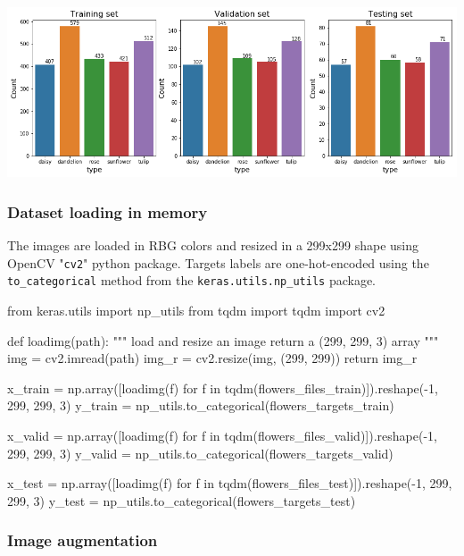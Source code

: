 \begin{flushleft}
	\includegraphics[scale=.5]{./sections/03_methodology/output_18_0.png}
\end{flushleft}

\newpage
\subsubsection{Dataset loading in memory}

The images are loaded in RBG colors and resized in a 299x299 shape using OpenCV "\texttt{cv2}" python package. 
Targets labels are one-hot-encoded using the \texttt{to\_categorical} method from the \texttt{keras.utils.np\_utils} package.

\begin{python}
from keras.utils import np_utils
from tqdm import tqdm
import cv2

def loadimg(path):
	"""
	load and resize an image
	return a (299, 299, 3) array
	"""
	img = cv2.imread(path)
	img_r = cv2.resize(img, (299, 299))
	return img_r

x_train = np.array([loadimg(f) for f in tqdm(flowers_files_train)]).reshape(-1, 299, 299, 3)
y_train =  np_utils.to_categorical(flowers_targets_train)

x_valid = np.array([loadimg(f) for f in tqdm(flowers_files_valid)]).reshape(-1, 299, 299, 3)
y_valid =  np_utils.to_categorical(flowers_targets_valid)

x_test = np.array([loadimg(f) for f in tqdm(flowers_files_test)]).reshape(-1, 299, 299, 3)
y_test =  np_utils.to_categorical(flowers_targets_test)

\end{python}

\newpage
\subsubsection{Image augmentation}
\label{subsubsec:Image_augmentation}

